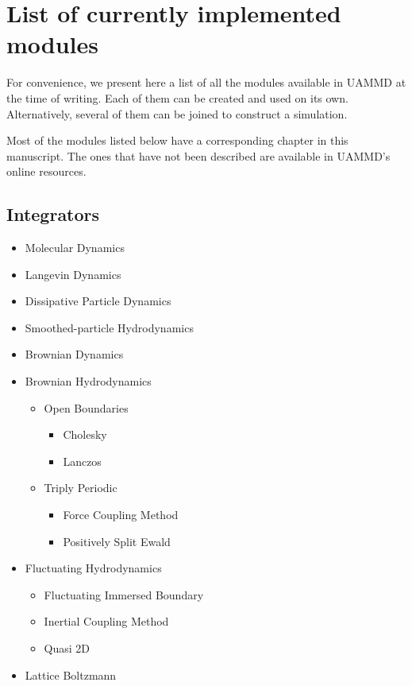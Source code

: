 \documentclass[twoside,openright,titlepage,numbers=noenddot,%
headinclude,footinclude,cleardoublepage=empty,abstract=on,
BCOR=5mm,fontsize=11pt, dvipsnames, paper=b5
]{scrreprt}
\newcommand{\uammd}{\gls{UAMMD}\xspace}
\begin{document}
   
\chapter{List of currently implemented modules}\label{sec:modulelist}

For convenience, we present here a list of all the modules available in \uammd at the time of writing. Each of them can be created and used on its own. Alternatively, several of them can be joined to construct a simulation.

Most of the modules listed below have a corresponding chapter in this manuscript. The ones that have not been described are available in \uammd's online resources.

\section{Integrators}

\begin{itemize}
\item Molecular Dynamics
\item Langevin Dynamics
\item Dissipative Particle Dynamics
\item Smoothed-particle Hydrodynamics
\item Brownian Dynamics
\item Brownian Hydrodynamics
  \begin{itemize}
  \item Open Boundaries
    \begin{itemize}
    \item Cholesky
    \item Lanczos
    \end{itemize}
  \item Triply Periodic
    \begin{itemize}
    \item Force Coupling Method
    \item Positively Split Ewald
    \end{itemize}
  \end{itemize}
\item Fluctuating Hydrodynamics
  \begin{itemize}
  \item Fluctuating Immersed Boundary
  \item Inertial Coupling Method
  \item Quasi 2D
  \end{itemize}
\item Lattice Boltzmann
\end{itemize}
\end{document}
